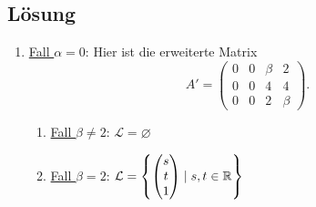 \subsection{Lösung}
\begin{enumerate}
	\item \underline{Fall \( \alpha = 0\)}: Hier ist die erweiterte Matrix
	\begin{equation*}
	 	A' = \left( \begin{array}{ccc|c}
	 		0 & 0 & \beta & 2 \\
	 		0 & 0 & 4 & 4 \\
	 		0 & 0 & 2 & \beta
	 	\end{array} \right)\text{.}
	 \end{equation*}
	 \begin{enumerate}
	 	\item \underline{Fall \( \beta \neq 2 \)}: \( \mathcal{L} = \varnothing \)
	 	\item \underline{Fall \( \beta = 2 \)}: \( \mathcal{L} = \left \{ \begin{pmatrix}
	 		s \\ t \\ 1
	 	\end{pmatrix} \mid s,t \in \mathbb{R} \right \} \) 
	\end{enumerate}


\end{enumerate}
